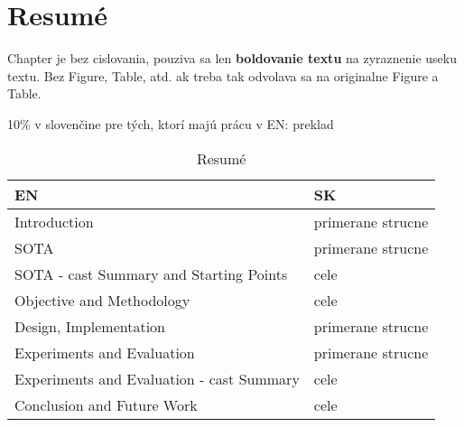 \chapter*{Resumé}
\label{chapter:resume}

Chapter je bez cislovania, pouziva sa len \textbf{boldovanie textu} na zyraznenie useku textu. Bez Figure, Table, atd. ak treba tak odvolava sa na originalne Figure a Table.

10\% v slovenčine pre tých, ktorí majú prácu v EN: preklad
\begin{table}[ht]
    \begin{tabular}{l|l}
    \toprule
        EN & SK \\
    \midrule
        Introduction                            & primerane strucne \\
        SOTA                                    & primerane strucne \\
        SOTA - cast Summary and Starting Points & cele \\
        Objective and Methodology               & cele \\
        Design, Implementation                  & primerane strucne \\
        Experiments and Evaluation              & primerane strucne \\
        Experiments and Evaluation - cast Summary & cele \\
        Conclusion and Future Work              & cele \\
    \bottomrule
    \end{tabular}
    \caption{Resumé}
    \label{tab:Resumé}
\end{table}

